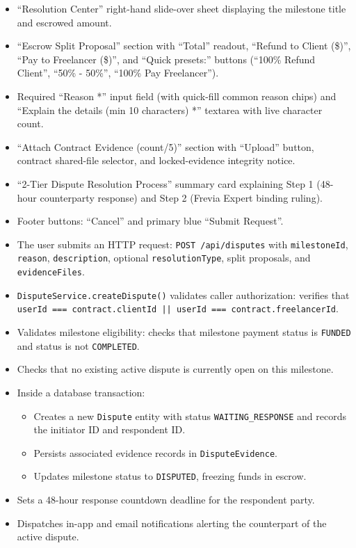 \begin{itemize}[leftmargin=1.6em,topsep=3pt,itemsep=2pt,parsep=0pt,label=$\bullet$]
      \item ``Resolution Center'' right-hand slide-over sheet displaying the milestone title and escrowed amount.
      \item ``Escrow Split Proposal'' section with ``Total'' readout, ``Refund to Client (\$)'', ``Pay to Freelancer (\$)'', and ``Quick presets:'' buttons (``100\% Refund Client'', ``50\% - 50\%'', ``100\% Pay Freelancer'').
      \item Required ``Reason *'' input field (with quick-fill common reason chips) and ``Explain the details (min 10 characters) *'' textarea with live character count.
      \item ``Attach Contract Evidence (count/5)'' section with ``Upload'' button, contract shared-file selector, and locked-evidence integrity notice.
      \item ``2-Tier Dispute Resolution Process'' summary card explaining Step 1 (48-hour counterparty response) and Step 2 (Frevia Expert binding ruling).
      \item Footer buttons: ``Cancel'' and primary blue ``Submit Request''.
\end{itemize}

\begin{itemize}[leftmargin=1.6em,topsep=3pt,itemsep=2pt,parsep=0pt,label=$\bullet$]
      \item The user submits an HTTP request: \texttt{POST /api/disputes} with \texttt{milestoneId}, \texttt{reason}, \texttt{description}, optional \texttt{resolutionType}, split proposals, and \texttt{evidenceFiles}.
      \item \texttt{DisputeService.createDispute()} validates caller authorization: verifies that \texttt{userId === contract.clientId || userId === contract.freelancerId}.
      \item Validates milestone eligibility: checks that milestone payment status is \texttt{FUNDED} and status is not \texttt{COMPLETED}.
      \item Checks that no existing active dispute is currently open on this milestone.
      \item Inside a database transaction:
            \begin{itemize}[leftmargin=1.6em,topsep=2pt,itemsep=2pt,parsep=0pt]
                  \item Creates a new \texttt{Dispute} entity with status \texttt{WAITING\_RESPONSE} and records the initiator ID and respondent ID.
                  \item Persists associated evidence records in \texttt{DisputeEvidence}.
                  \item Updates milestone status to \texttt{DISPUTED}, freezing funds in escrow.
            \end{itemize}
      \item Sets a 48-hour response countdown deadline for the respondent party.
      \item Dispatches in-app and email notifications alerting the counterpart of the active dispute.
\end{itemize}

